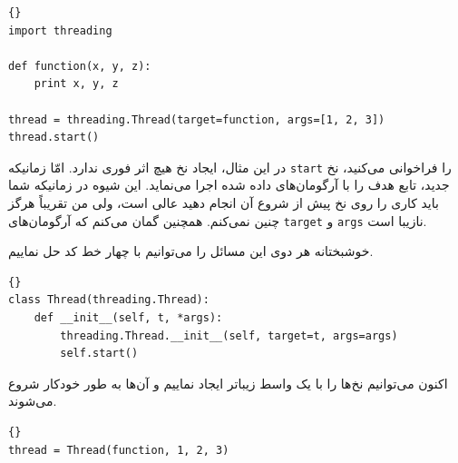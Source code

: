 \documentclass{book}
\begin{document}
\begin{latin}
\begin{lstlisting}[title=\rl{مثال نخ (شیوه معمول)}]{}
import threading

def function(x, y, z):
    print x, y, z

thread = threading.Thread(target=function, args=[1, 2, 3])
thread.start()
\end{lstlisting}
\end{latin}

    در این مثال، ایجاد نخ هیچ اثر فوری ندارد. امّا زمانیکه  {\tt start} را فراخوانی می‌کنید، نخ جدید، تابع هدف را با آرگومان‌های داده شده اجرا می‌نماید. 
    این شیوه در زمانیکه شما باید کاری را روی نخ پیش از شروع آن انجام دهید عالی است،‌ ولی من تقریباً  هرگز چنین نمی‌کنم. 
    همچنین گمان می‌کنم که آرگومان‌های {\tt target} و {\tt args} نازیبا است. 

    خوشبختانه هر دوی این مسائل را می‌توانیم با چهار خط کد حل نماییم. 

\begin{latin}
\begin{lstlisting}[title=\rl{کلاس  نخ تمیزکاری  شده}]{}
class Thread(threading.Thread):
    def __init__(self, t, *args):
        threading.Thread.__init__(self, target=t, args=args)
        self.start()
\end{lstlisting}
\end{latin}

    اکنون می‌توانیم نخ‌ها را با یک واسط زیباتر ایجاد نماییم و  آن‌ها به طور خودکار شروع می‌شوند. 

\begin{latin}
\begin{lstlisting}[title=\rl{مثال نخ (به روش من)
}]{}
thread = Thread(function, 1, 2, 3)
\end{lstlisting}
\end{latin}
\end{document}
